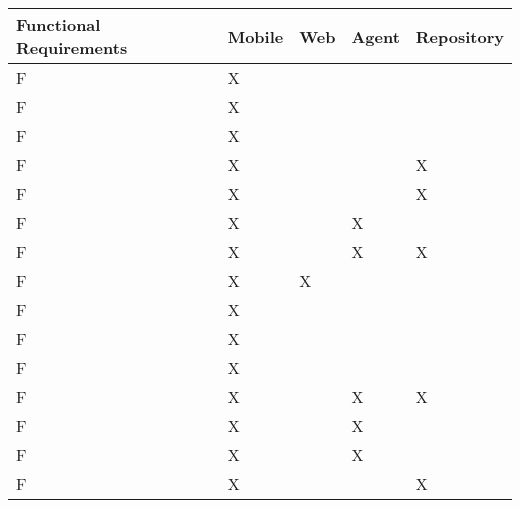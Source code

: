 
\newcommand\rownum{
	\stepcounter{rownumbers}
	F\arabic{rownumbers}
}

\begin{tabular}{ | l | l | l | l | l |}
\hline
Functional Requirements 											& Mobile & Web & Agent & Repository \\ \hline
\rownum                                                                & X      &     &       &            \\ \hline
\rownum                                                                & X      &     &       &            \\ \hline
\rownum                                                                & X      &     &       &            \\ \hline
\rownum                                                                & X      &     &       & X           \\ \hline
\rownum                                                                & X      &     &       & X           \\ \hline
\rownum                                                                & X      &     & X      &            \\ \hline
\rownum                                                                & X      &     & X     & X          \\ \hline
\rownum                                                                & X      & X   &       &            \\ \hline
\rownum                                                               & X      &     &       &            \\ \hline
\rownum                                                               & X      &     &       &            \\ \hline
\rownum                                                               & X      &     &       &            \\ \hline
\rownum                                                               & X      &     & X     & X          \\ \hline
\rownum                                                               & X      &     & X      &            \\ \hline
\rownum                                                               & X      &     & X     &            \\ \hline
\rownum                                                               & X      &     &       & X          \\ \hline

\end{tabular}
